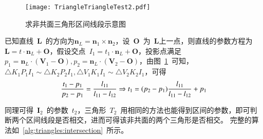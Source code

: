 \begin{figure}[htb]
  \centering
    \texttt{[image: TriangleTriangleTest2.pdf]}
    \caption{求非共面三角形区间线段示意图\cite{Moller1997}}
  \label{fig:two:triangle:ui2}
\end{figure}

已知直线~$\bm{L}$~的方向为$\bm{n}_L = \bm{n}_1 \times \bm{n}_2$，设~$\bm{O}$~为~$\bm{L}$上一点，则直线的参数方程为
$\bm{L} = t \cdot \bm{n}_L + \bm{O}$，假设交点~$I_1 = t_1 \cdot \bm{n}_L + \bm{O}$，投影点满足
$p_1 = \bm{n}_L \cdot(\bm{V}_1 - \bm{O}), p_2 = \bm{n}_L \cdot (\bm{V}_2 - \bm{O})$，由图~\ref{fig:two:triangle:ui2}~可知，
$\bigtriangleup K_1P_1I_1 \sim \bigtriangleup K_2P_2I_1, \bigtriangleup V_1K_1I_1 \sim \bigtriangleup V_2K_2I_1$，可得
\begin{equation}
  \frac{t_1 - p_1}{p_2-p_1} = \frac{l_{11}}{l_{11}-l_{12}} \Rightarrow \newline
   t_1 = (p_2-p_1)\frac{l_{11}}{l_{11}-l_{12}} + p_1
  \label{equa:triangle:intersectionline:param}
\end{equation}

同理可得~$\bm{I}_2$~的参数~$t_2$，三角形~$T_2$~用相同的方法也能得到区间的参数，即可判断两个区间线段是否相交，进而可得该非共面的两个三角形是否相交。
完整的算法如~\ref{alg:triangles:intersection}~所示。

